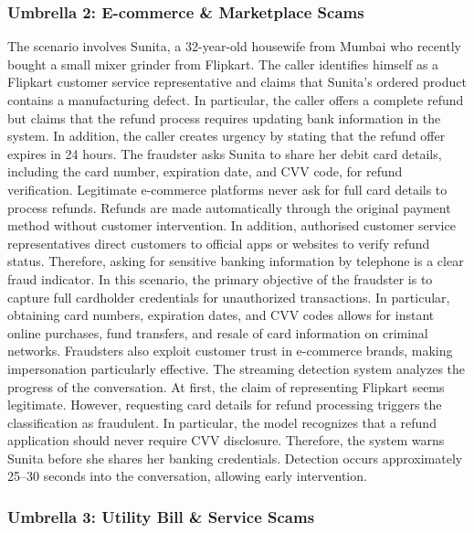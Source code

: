 \documentclass{article}
\begin{document}
\subsubsection{Umbrella 2: E-commerce \& Marketplace Scams}
\label{app:casestudy:ecommerce}

The scenario involves Sunita, a 32-year-old housewife from Mumbai who recently bought a small mixer grinder from Flipkart. The caller identifies himself as a Flipkart customer service representative and claims that Sunita's ordered product contains a manufacturing defect. In particular, the caller offers a complete refund but claims that the refund process requires updating bank information in the system. In addition, the caller creates urgency by stating that the refund offer expires in 24 hours. The fraudster asks Sunita to share her debit card details, including the card number, expiration date, and CVV code, for refund verification. Legitimate e-commerce platforms never ask for full card details to process refunds. Refunds are made automatically through the original payment method without customer intervention. In addition, authorised customer service representatives direct customers to official apps or websites to verify refund status. Therefore, asking for sensitive banking information by telephone is a clear fraud indicator. In this scenario, the primary objective of the fraudster is to capture full cardholder credentials for unauthorized transactions. In particular, obtaining card numbers, expiration dates, and CVV codes allows for instant online purchases, fund transfers, and resale of card information on criminal networks. Fraudsters also exploit customer trust in e-commerce brands, making impersonation particularly effective. The streaming detection system analyzes the progress of the conversation. At first, the claim of representing Flipkart seems legitimate. However, requesting card details for refund processing triggers the classification as fraudulent. In particular, the model recognizes that a refund application should never require CVV disclosure. Therefore, the system warns Sunita before she shares her banking credentials. Detection occurs approximately 25--30 seconds into the conversation, allowing early intervention.

\subsubsection{Umbrella 3: Utility Bill \& Service Scams}
\label{app:casestudy:utility}
\end{document}

